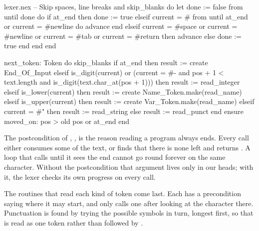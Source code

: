 \begin{continued}{lexer.nex}
  -- Skip spaces, line breaks and %
  skip_blanks
  do
    let done := false
    from until done do
      if at_end then
        done := true
      elseif current = #%
        from until at_end or current = #newline do
          advance
        end
      elseif current = #space or current = #newline or current = #tab or current = #return then
        advance
      else
        done := true
      end
    end
  end

  next_token: Token
  do
    skip_blanks
    if at_end then
      result := create End_Of_Input
    elseif is_digit(current) or (current = #- and pos + 1 < text.length
                                 and is_digit(text.char_at(pos + 1))) then
      result := read_integer
    elseif is_lower(current) then
      result := create Name_Token.make(read_name)
    elseif is_upper(current) then
      result := create Var_Token.make(read_name)
    elseif current = #" then
      result := read_string
    else
      result := read_punct
    end
  ensure
    moved_on: pos > old pos or at_end
  end
\end{continued}

The postcondition of , , is the reason
reading a program always ends. Every call either consumes some of the
text, or finds that there is none left and returns . A
loop that calls  until it sees the end cannot go round
forever on the same character. Without the postcondition that argument
lives only in our heads; with it, the lexer checks its own progress on
every call.

The routines that read each kind of token come last. Each has a
precondition saying where it may start, and  only calls
one after looking at the character there. Punctuation is found by trying
the possible symbols in turn, longest first, so that \code{:-} is read as
one token rather than \code{:} followed by \code{-}.

